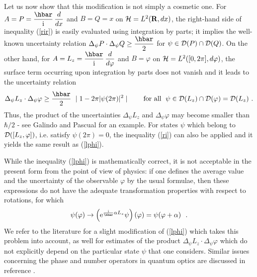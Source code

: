 \documentclass[12pt]{report}
\begin{document}
Let us now show that this modification is not simply a cosmetic one. 
For 
$A=P= \ds{\hbar \over \ri} \, \ds{d \over dx}$ and $B=Q=x$
 on ${\cal H} = L^2 ( {\bf R}, dx)$, the right-hand side of inequality 
(\ref{rir}) is easily evaluated using integration by parts;  
it implies the well-known uncertainty relation 
$\Delta_{\psi} P \cdot
\Delta_{\psi} Q \geq \ds{\hbar  \over 2}$ for  $\psi \in
{\cal D}(P) \cap {\cal D}(Q)$.
On the other hand, for 
$A= L_z = \ds{\hbar \over \ri} \, \ds{d \over
d\varphi}$ and $B=\varphi$
 on ${\cal H} = L^2 ( [0,2\pi ] , d\varphi )$, the surface term 
 occurring upon integration by parts does not vanish and it leads
 to the uncertainty relation 
\begin{equation}
\label{lphi}
\Delta_{\psi} L_z \cdot
\Delta_{\psi} \varphi \geq \ds{\hbar  \over 2}
\ \mid 1 - 2 \pi | \psi (2 \pi ) | ^2 \mid \qquad
\mbox{for all} \ \; \psi \in {\cal D}(L_z) \cap {\cal D}(\varphi)
= {\cal D} (L_z)
\ .
\end{equation}
Thus, the product of the uncertainties 
$\Delta_{\psi} L_z$ and 
$\Delta_{\psi} \varphi$ 
may become smaller than 
$\hbar /2$
- see Galindo and Pascual \cite{gap} for an example. 
For states   
$\psi$ which belong to ${\cal D} ([L_z , \varphi ] )$, i.e. 
satisfy 
$\psi (2 \pi )=0$, the inequality  (\ref{ri}) 
can also be applied and it yields the same result as (\ref{lphi}).
 
While the inequality (\ref{lphi}) is mathematically correct, 
it is not acceptable in the present 
form from the point of view of physics: 
if one defines the average value and the uncertainty of the observable 
$\varphi$ by the usual formulae, then 
these expressions do not have the 
adequate transformation properties with respect to rotations,
for which 
\[
\psi (\varphi ) \to 
\left( {\rm e} ^{ {\ri \over \hbar} \alpha L_z }  \psi \right) 
(\varphi )
= \psi (\varphi + \alpha)
\ \ .
\]
We refer to the literature 
\cite{ju,krau}
for a slight modification of (\ref{lphi})
 which takes this problem into account, as well for 
estimates of the product  
$\Delta_{\psi} L_z \cdot
\Delta_{\psi} \varphi$ 
which do not explicitly depend on the particular state 
$\psi$ that one considers. 
Similar issues concerning the phase and number operators 
in quantum optics are discussed in reference \cite{car}. 
 
 
\bigskip
 
\end{document}
